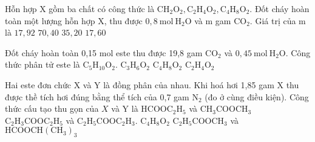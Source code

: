 \begin{vdex}[2]
	Hỗn hợp $\mathrm{X}$ gồm ba chất có công thức là $\mathrm{CH}_2 \mathrm{O}_2, \mathrm{C}_2 \mathrm{H}_4 \mathrm{O}_2, \mathrm{C}_4 \mathrm{H}_8 \mathrm{O}_2$. Đốt cháy hoàn toàn một lượng hỗn hợp $\mathrm{X}$, thu được $0,8 \mathrm{~mol}~\mathrm{H}_2 \mathrm{O}$ và $\mathrm{m}$ gam $\mathrm{CO}_2$. Giá trị của $\mathrm{m}$ là
	\choice
	{%
		$ 17,92 $
	}
	{%
		$ 70,40  $
	}
	{%
		\True $ 35,20 $
	}
	{%
		$ 17,60 $
	}
\end{vdex}
\begin{vdex}[2]
Đốt cháy hoàn toàn 0,15 mol este thu được 19,8 gam $\mathrm{CO}_2$ và $0,45 \mathrm{~mol}~ \mathrm{H}_2 \mathrm{O}$. Công thức phân tử este là
	\choice
	{%
		$\mathrm{C}_5 \mathrm{H}_{10} \mathrm{O}_2$.
	}
	{%
	\True $\mathrm{C}_3 \mathrm{H}_6 \mathrm{O}_2$
	}
	{%
		$\mathrm{C}_4 \mathrm{H}_8 \mathrm{O}_2$
	}
	{%
		$\mathrm{C}_2 \mathrm{H}_4 \mathrm{O}_2$
	}
\end{vdex}

\begin{vdex}[2][(Đề TSĐH B - 2007)]
	Hai este đơn chức $\mathrm{X}$ và $\mathrm{Y}$ là đồng phân của nhau. Khi hoá hơi 1,85 gam $\mathrm{X}$ thu được thề tích hơi đúng bằng thể tích của 0,7 gam $\mathrm{N}_2$ (đo ở cùng điều kiện). Công thức cấu tạo thu gọn của $X$ và $\mathrm{Y}$ là
	\choice
	{%
	\True $\mathrm{HCOOC}_2 \mathrm{H}_5$ và $\mathrm{CH}_3 \mathrm{COOCH}_3$
	}
	{%
		$\mathrm{C}_2 \mathrm{H}_3 \mathrm{COOC}_2 \mathrm{H}_5$ và $\mathrm{C}_2 \mathrm{H}_5 \mathrm{COOC}_2 \mathrm{H}_3$.
	}
	{%
		$\mathrm{C}_4 \mathrm{H}_8 \mathrm{O}_2$
	}
	{%
		$\mathrm{C}_2 \mathrm{H}_5 \mathrm{COOCH}_3$ và $\mathrm{HCOOCH}\left(\mathrm{CH}_3\right)_3$
	}
	\huongdan{
	
	}
\end{vdex}

